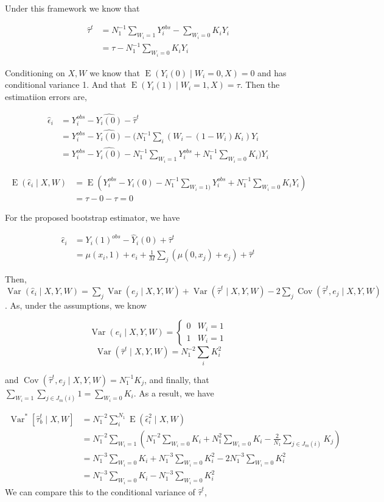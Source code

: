 \documentclass{article}
\DeclareMathOperator{\E}{E}
\DeclareMathOperator{\Var}{Var}
\DeclareMathOperator{\Cov}{Cov}
\newcommand{\hta}{\hat \tau^{t}}
\newcommand{\he}{\hat{\epsilon}_{i}}
\newcommand{\Yi}{Y_{i}^{obs}}
\newcommand{\hYi}{\hat{Y_{i}(0)}}
\begin{document}
Under this framework we know that

\begin{align} \hat \tau^{t} &= N_{1}^{-1}\sum_{W_{i} = 1}Y_{i}^{obs}-\sum_{W_{i} = 0}K_{i}Y_{i} \\
&= \tau -N_{1}^{-1}\sum_{W_{i} = 0}K_{i}Y_{i} \end{align}

Conditioning on $X,W$ we know that $\E(Y_{i}(0) \mid W_{i} = 0, X) = 0$ and has conditional variance 1. And that $\E(Y_{i}(1) \mid W_{i} = 1, X) = \tau$. Then the estimatiion errors are,

\begin{align*} \he &= \Yi - \hYi-\hta \\
&= \Yi - \hYi - (N_{1}^{-1}\sum_{i}(W_{i}-(1-W_{i})K_{i})Y_{i} \\
&= \Yi - \hYi - N_{1}^{-1}\sum_{W_{i} = 1}\Yi+N_{1}^{-1}\sum_{W_{i}=0}K_{i})Y_{i}\end{align*}

\begin{align*}\E(\he \mid X,W) &= \E(\Yi - \hYi - N_{1}^{-1}\sum_{W_{i} =
1)}\Yi+N_{1}^{-1}\sum_{W_{i}=0}K_{i}Y_{i}) \\ &= \tau-0-\tau = 0\end{align*}

For the proposed bootstrap estimator, we have

\begin{align*} \hat \epsilon_{i} &= Y_{i}(1)^{obs}-\hat Y_{i}(0)+\hat \tau^{t} \\
&= \mu(x_{i},1)+e_{i}+\frac{1}{M}\sum_{j}\left(\mu(0,x_{j})+e_{j}\right)+\hat \tau^{t} \end{align*}

Then, $\Var(\he\mid X,Y,W) = \sum_{j}\Var(e_{j}\mid X,Y,W)+\Var(\hat \tau^{t}\mid X,Y,W)-2\sum_{j}\Cov(\hat \tau^{t},e_{j}\mid X,Y,W)$. As, under the assumptions, we know 

$$\Var(e_{i}\mid X,Y,W) = \begin{cases}0 & W_{i} = 1 \\ 1 & W_{i} = 1 \end{cases}$$
$$\Var(\hat \tau^{t} \mid X,Y,W) = N_{1}^{-2}\sum_{i}K_{i}^{2}$$

and $\Cov(\hat \tau^{t},e_{j}\mid X,Y,W) = N_{1}^{-1}K_{j}$, and finally, that $\sum_{W_{i}=1}\sum_{j \in J_{m}(i)}1 = \sum_{W_{i} = 0}K_{i}$. As a result, we have


\begin{align*} \Var^{*}[\hat \tau_{b}^{t} \mid X,W] &= N_{1}^{-2}\sum_{i}^{N_{1}}\E(\he^{2} \mid X,W) \\
&= N_{1}^{-2}\sum_{W_{i}=1}\left(N_{1}^{-2}\sum_{W_{i}=0}K_{i}+N_{1}^{2}\sum_{W_{i}=0}K_{i}-\frac{2}{N_{1}}\sum_{j \in J_{m}(i)}K_{j}\right) \\
&= N_{1}^{-3}\sum_{W_{i}=0}K_{i}+N_{1}^{-3}\sum_{W_{i}=0}K_{i}^{2}-2N_{1}^{-3}\sum_{W_{i}=0}K_{i}^{2} \\
&= N_{1}^{-3}\sum_{W_{i}=0}K_{i}-N_{1}^{-3}\sum_{W_{i}=0}K_{i}^{2}\end{align*}
 We can compare this to the conditional variance of $\hta$,
\end{document}
